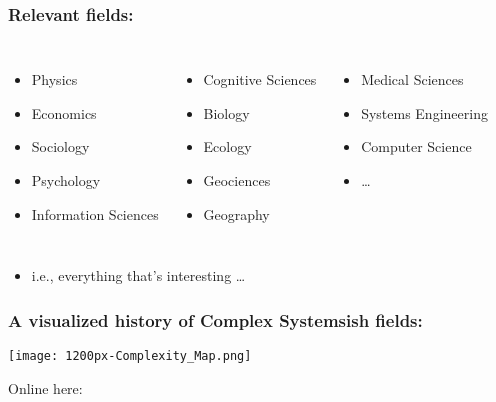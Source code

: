 \begin{frame}
  \frametitle{Relevant fields:}

  \begin{block}{}
    \begin{columns}
      \begin{itemize}
      \item 
        Physics
      \item 
        Economics
      \item 
        Sociology
      \item 
        Psychology
      \item 
        Information Sciences
      \end{itemize}
      \begin{itemize}
      \item 
        Cognitive Sciences
      \item 
        Biology
      \item 
        Ecology
      \item 
        Geociences
      \item 
        Geography
      \end{itemize}
      \begin{itemize}
      \item 
        Medical Sciences
      \item 
        Systems Engineering
      \item 
        Computer Science
      \item 
      \ldots
      \end{itemize}
    \end{columns}
  \end{block}

  \begin{itemize}
  \item<+->
    i.e., everything that's interesting \ldots
  \end{itemize}

\end{frame}

\begin{frame}
  \frametitle{A visualized history of Complex Systemsish fields:}

  \texttt{[image: 1200px-Complexity\_Map.png]}
  

  Online here:
\end{frame}


